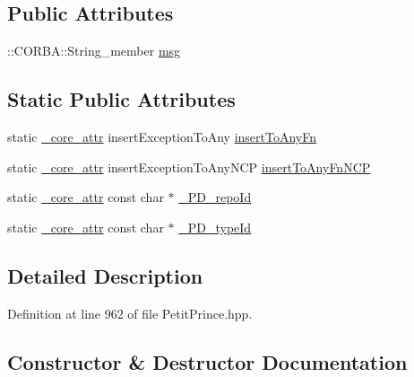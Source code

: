 \subsection*{Public Attributes}
\begin{DoxyCompactItemize}
\item 
\+::C\+O\+R\+B\+A\+::\+String\+\_\+member \hyperlink{class_draw_service_1_1_unexpected_draw_a50b800e0cd7cf856795cef5bc7f3559e}{msg}
\end{DoxyCompactItemize}
\subsection*{Static Public Attributes}
\begin{DoxyCompactItemize}
\item 
static \hyperlink{_petit_prince_8hpp_a5f7bf7cddb608c2aad7c95f55f8a33c5}{\+\_\+core\+\_\+attr} insert\+Exception\+To\+Any \hyperlink{class_draw_service_1_1_unexpected_draw_ac6b1f9d4c18d5348448cc060dfa40b2c}{insert\+To\+Any\+Fn}
\item 
static \hyperlink{_petit_prince_8hpp_a5f7bf7cddb608c2aad7c95f55f8a33c5}{\+\_\+core\+\_\+attr} insert\+Exception\+To\+Any\+N\+CP \hyperlink{class_draw_service_1_1_unexpected_draw_ad2cb451677a167ec2cf37ad5a4527831}{insert\+To\+Any\+Fn\+N\+CP}
\item 
static \hyperlink{_petit_prince_8hpp_a5f7bf7cddb608c2aad7c95f55f8a33c5}{\+\_\+core\+\_\+attr} const char $\ast$ \hyperlink{class_draw_service_1_1_unexpected_draw_ac0a9c8c9d4a75000fecec286549a4c04}{\+\_\+\+P\+D\+\_\+repo\+Id}
\item 
static \hyperlink{_petit_prince_8hpp_a5f7bf7cddb608c2aad7c95f55f8a33c5}{\+\_\+core\+\_\+attr} const char $\ast$ \hyperlink{class_draw_service_1_1_unexpected_draw_a76ceffb40e6ef645a7a10c9e14684e8f}{\+\_\+\+P\+D\+\_\+type\+Id}
\end{DoxyCompactItemize}


\subsection{Detailed Description}


Definition at line 962 of file Petit\+Prince.\+hpp.



\subsection{Constructor \& Destructor Documentation}
